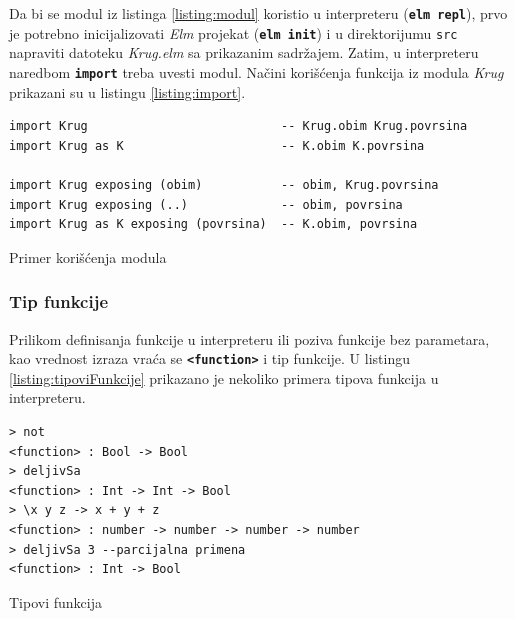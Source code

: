 \documentclass[12pt,oneside]{memoir}
\begin{document}
Da bi se modul iz listinga \ref{listing:modul} koristio u interpreteru (\texttt{\textbf{elm repl}}),
prvo je potrebno inicijalizovati \emph{Elm} projekat (\texttt{\textbf{elm init}}) i u direktorijumu \texttt{src} napraviti 
datoteku \emph{Krug.elm} sa prikazanim sadržajem. Zatim, u interpreteru naredbom 
\texttt{\textbf{import}} treba uvesti modul. Načini korišćenja funkcija iz modula
\emph{Krug} prikazani su u listingu \ref{listing:import}.
\begin{listing}[h]
\begin{verbatim}
import Krug                           -- Krug.obim Krug.povrsina
import Krug as K                      -- K.obim K.povrsina

import Krug exposing (obim)           -- obim, Krug.povrsina
import Krug exposing (..)             -- obim, povrsina
import Krug as K exposing (povrsina)  -- K.obim, povrsina
\end{verbatim}
\caption{Primer korišćenja modula}
\label{listing:import}
\end{listing}

\subsubsection{Tip funkcije}
Prilikom definisanja funkcije u interpreteru ili
poziva funkcije bez parametara, kao vrednost izraza vraća se \texttt{\textbf{<function>}} 
i tip funkcije. U listingu  \ref{listing:tipoviFunkcije} prikazano je nekoliko primera 
tipova funkcija u interpreteru.
\begin{listing}[h]
\begin{verbatim}
> not
<function> : Bool -> Bool
> deljivSa
<function> : Int -> Int -> Bool
> \x y z -> x + y + z
<function> : number -> number -> number -> number
> deljivSa 3 --parcijalna primena
<function> : Int -> Bool
\end{verbatim}
\caption{Tipovi funkcija}
\label{listing:tipoviFunkcije}
\end{listing} 
  
\end{document}
